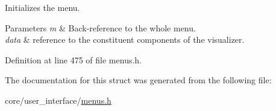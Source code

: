 Initializes the menu. 


\begin{DoxyParams}{Parameters}
{\em m} & Back-\/reference to the whole menu. \\
\hline
{\em data} & reference to the constituent components of the visualizer. \\
\hline
\end{DoxyParams}


Definition at line 475 of file menus.\+h.



The documentation for this struct was generated from the following file\+:\begin{DoxyCompactItemize}
\item 
core/user\+\_\+interface/\hyperlink{menus_8h}{menus.\+h}\end{DoxyCompactItemize}

